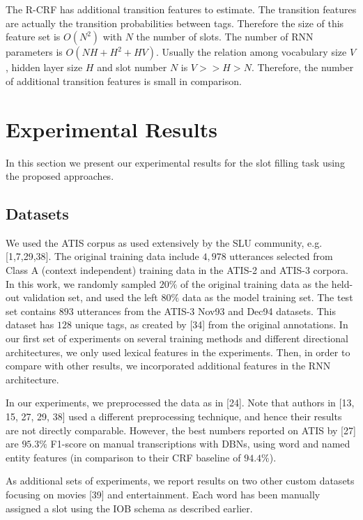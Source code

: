 The R-CRF has additional transition features to estimate. The transition
features are actually the transition probabilities between tags. Therefore the
size of this feature set is $O(N^{2})$ with $N$ the number of slots. The number of
RNN parameters is $O(NH+H^{2}+HV)$. Usually the relation among vocabulary size $V$,
hidden layer size $H$ and slot number $N$ is $V>>H>N$.  Therefore, the number of
additional transition features is small in comparison.

\section{Experimental Results}
\label{sec:exp}

In this section we present our experimental results for the slot filling task
using the proposed approaches.

\subsection{Datasets}

We used the ATIS corpus as used extensively by the SLU community, e.g.
[1,7,29,38]. The original training data include $4,978$ utterances selected from
Class A (context independent) training data in the ATIS-2 and ATIS-3 corpora.
In this work, we randomly sampled $20\%$ of the original training data as the
held-out validation set, and used the left $80\%$ data as the model training set.
The test set contains $893$ utterances from the ATIS-3 Nov93 and Dec94 datasets.
This dataset has $128$ unique tags, as created by [34] from the original
annotations. In our first set of experiments on several training methods and
different directional architectures, we only used lexical features in the
experiments. Then, in order to compare with other results, we incorporated
additional features in the RNN architecture.

In our experiments, we preprocessed the data as in [24]. Note that authors in
[13, 15, 27, 29, 38] used a different preprocessing technique, and hence their
results are not directly comparable. However, the best numbers reported on ATIS
by [27] are $95.3\%$ F1-score on manual transcriptions with DBNs, using word and
named entity features (in comparison to their CRF baseline of $94.4\%$).

As additional sets of experiments, we report results on two other custom
datasets focusing on movies [39] and entertainment. Each word has been manually
assigned a slot using the IOB schema as described earlier.  

